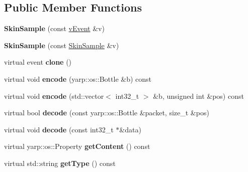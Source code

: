 \subsection*{Public Member Functions}
\begin{DoxyCompactItemize}
\item 
\mbox{\label{classev_1_1SkinSample_a86431fb3cf157ed4bdf4945800d6a322}} 
{\bfseries Skin\+Sample} (const \hyperlink{classev_1_1vEvent}{v\+Event} \&v)
\item 
\mbox{\label{classev_1_1SkinSample_af786fa6b5a90decbeea3e07463de1fc6}} 
{\bfseries Skin\+Sample} (const \hyperlink{classev_1_1SkinSample}{Skin\+Sample} \&v)
\item 
\mbox{\label{classev_1_1SkinSample_ab3a5efb43e33bd9d850d453528f14a2d}} 
virtual event {\bfseries clone} ()
\item 
\mbox{\label{classev_1_1SkinSample_a92eceaf22956154e9542666fddca3033}} 
virtual void {\bfseries encode} (yarp\+::os\+::\+Bottle \&b) const
\item 
\mbox{\label{classev_1_1SkinSample_a289c3ea0ff427774ca9b8130c4baa582}} 
virtual void {\bfseries encode} (std\+::vector$<$ int32\+\_\+t $>$ \&b, unsigned int \&pos) const
\item 
\mbox{\label{classev_1_1SkinSample_aa20e0f7f80901929b4e62d35ea31b154}} 
virtual bool {\bfseries decode} (const yarp\+::os\+::\+Bottle \&packet, size\+\_\+t \&pos)
\item 
\mbox{\label{classev_1_1SkinSample_a68e23ad4982187ceb71c7da352a5d176}} 
virtual void {\bfseries decode} (const int32\+\_\+t $\ast$\&data)
\item 
\mbox{\label{classev_1_1SkinSample_a7217f41079feb258f2d7fe7b78343d0e}} 
virtual yarp\+::os\+::\+Property {\bfseries get\+Content} () const
\item 
\mbox{\label{classev_1_1SkinSample_a155fa0df968551153daf45139a38c5a5}} 
virtual std\+::string {\bfseries get\+Type} () const
\end{DoxyCompactItemize}
